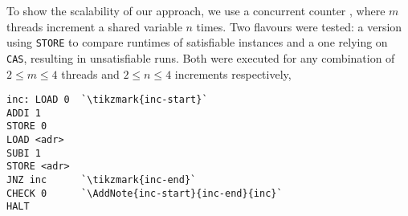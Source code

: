 To show the scalability of our approach, we  use a  concurrent counter , where $m$ threads increment a shared variable $n$ times.
Two flavours were tested: a  version using \lstinline[style=asm]{STORE} to compare runtimes of satisfiable instances and a  one relying on \lstinline[style=asm]{CAS}, resulting in unsatisfiable runs.
Both were executed for any combination of $2 \leq m \leq 4$ threads and $2 \leq n \leq 4$ increments respectively,

\begin{lstlisting}[style=asm, caption={\CHANGE{Faulty} counter template.}, label={lst:count:buggy}, xleftmargin=0.39\textwidth]
inc: LOAD 0  `\tikzmark{inc-start}`
ADDI 1
STORE 0
LOAD <adr>
SUBI 1
STORE <adr>
JNZ inc      `\tikzmark{inc-end}`
CHECK 0      `\AddNote{inc-start}{inc-end}{inc}`
HALT
\end{lstlisting}

